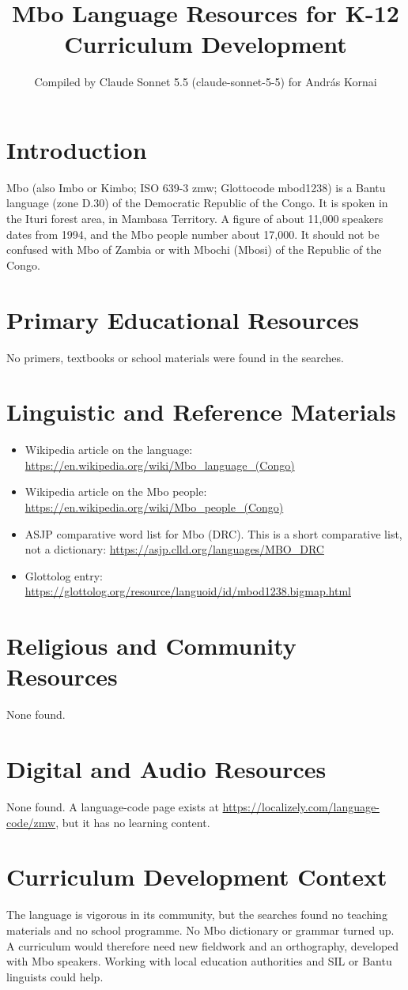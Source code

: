 \documentclass[12pt]{article}
\title{Mbo Language Resources for K-12 Curriculum Development}
\author{Compiled by Claude Sonnet 5.5 (claude-sonnet-5-5) for Andr\'as Kornai}
\date{}
\begin{document}
\maketitle

\section{Introduction}
Mbo (also Imbo or Kimbo; ISO 639-3 zmw; Glottocode mbod1238) is a Bantu language (zone D.30) of the Democratic Republic of the Congo. It is spoken in the Ituri forest area, in Mambasa Territory. A figure of about 11,000 speakers dates from 1994, and the Mbo people number about 17,000. It should not be confused with Mbo of Zambia or with Mbochi (Mbosi) of the Republic of the Congo.

\section{Primary Educational Resources}
No primers, textbooks or school materials were found in the searches.

\section{Linguistic and Reference Materials}
\begin{itemize}
\item Wikipedia article on the language: \url{https://en.wikipedia.org/wiki/Mbo_language_(Congo)}
\item Wikipedia article on the Mbo people: \url{https://en.wikipedia.org/wiki/Mbo_people_(Congo)}
\item ASJP comparative word list for Mbo (DRC). This is a short comparative list, not a dictionary: \url{https://asjp.clld.org/languages/MBO_DRC}
\item Glottolog entry: \url{https://glottolog.org/resource/languoid/id/mbod1238.bigmap.html}
\end{itemize}

\section{Religious and Community Resources}
None found.

\section{Digital and Audio Resources}
None found. A language-code page exists at \url{https://localizely.com/language-code/zmw}, but it has no learning content.

\section{Curriculum Development Context}
The language is vigorous in its community, but the searches found no teaching materials and no school programme. No Mbo dictionary or grammar turned up. A curriculum would therefore need new fieldwork and an orthography, developed with Mbo speakers. Working with local education authorities and SIL or Bantu linguists could help.
\end{document}
